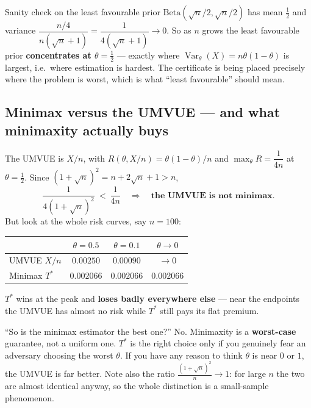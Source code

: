 \documentclass[11pt]{article}
\newcommand{\Var}{\operatorname{Var}}
\begin{document}
\begin{idea}{Sanity check on the least favourable prior}
$\mathrm{Beta}(\sqrt n/2,\sqrt n/2)$ has mean $\tfrac12$ and variance
$\dfrac{n/4}{n(\sqrt n+1)}=\dfrac{1}{4(\sqrt n+1)}\to0$. So as $n$ grows the least favourable
prior \textbf{concentrates at $\theta=\tfrac12$} --- exactly where $\Var_\theta(X)=n\theta(1-\theta)$
is largest, i.e.\ where estimation is hardest. The certificate is being placed precisely where
the problem is worst, which is what ``least favourable'' should mean.
\end{idea}

\subsection{Minimax versus the UMVUE --- and what minimaxity actually buys}

The UMVUE is $X/n$, with $R(\theta,X/n)=\theta(1-\theta)/n$ and
$\max_\theta R=\dfrac{1}{4n}$ at $\theta=\tfrac12$. Since
$(1+\sqrt n)^2=n+2\sqrt n+1>n$,
\[
\frac{1}{4(1+\sqrt n)^{2}}\ <\ \frac{1}{4n}
\quad\Longrightarrow\quad \textbf{the UMVUE is not minimax.}
\]
But look at the whole risk curves, say $n=100$:
\begin{center}
\renewcommand{\arraystretch}{1.3}
\begin{tabular}{@{}lccc@{}}
\toprule
& $\theta=0.5$ & $\theta=0.1$ & $\theta\to0$ \\
\midrule
UMVUE $X/n$ & $0.00250$ & $0.00090$ & $\to0$ \\
Minimax $T^*$ & $0.002066$ & $0.002066$ & $0.002066$ \\
\bottomrule
\end{tabular}
\end{center}
$T^*$ wins at the peak and \textbf{loses badly everywhere else} --- near the endpoints the
UMVUE has almost no risk while $T^*$ still pays its flat premium.

\begin{confusion}{``So is the minimax estimator the best one?''}
No. Minimaxity is a \textbf{worst-case} guarantee, not a uniform one. $T^*$ is the right choice
only if you genuinely fear an adversary choosing the worst $\theta$. If you have any reason to
think $\theta$ is near $0$ or $1$, the UMVUE is far better. Note also the ratio
$\frac{(1+\sqrt n)^2}{n}\to1$: for large $n$ the two are almost identical anyway, so the whole
distinction is a small-sample phenomenon.
\end{confusion}

\end{document}
